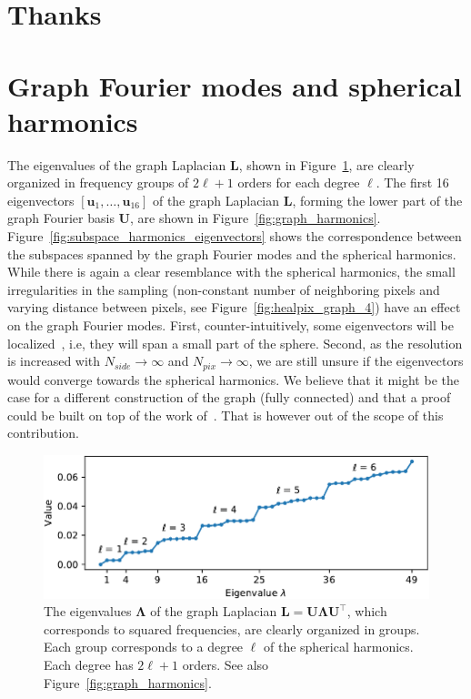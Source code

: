 \documentclass[final,twocolumn,3p,times,authoryear]{elsarticle}
\newcommand{\figref}[1]{Figure~\ref{fig:#1}}
\renewcommand{\b}[1]{{\bm{#1}}}   %
\newcommand{\1}{\b{1}}              %
\newcommand{\0}{\b{0}}              %
\renewcommand{\L}{\b{L}}
\newcommand{\U}{\b{U}}
\newcommand{\trans}{^\intercal}
\newcommand{\bLambda}{\b{\Lambda}}
\begin{document}
\section*{Thanks}

\appendix

\section{Graph Fourier modes and spherical harmonics}
\label{sec:comparison_spherical_harmonics}
\label{sec:border_effects}

The eigenvalues of the graph Laplacian $\L$, shown in \figref{graph_eigenvalues}, are clearly organized in frequency groups of $2\ell + 1$ orders for each degree $\ell$.
The first 16 eigenvectors $[\b u_1, \ldots, \b u_{16}]$ of the graph Laplacian $\L$, forming the lower part of the graph Fourier basis $\U$, are shown in \figref{graph_harmonics}. \figref{subspace_harmonics_eigenvectors} shows the correspondence between the subspaces spanned by the graph Fourier modes and the spherical harmonics. While there is again a clear resemblance with the spherical harmonics, the small irregularities in the sampling (non-constant number of neighboring pixels and varying distance between pixels, see \figref{healpix_graph_4}) have an effect on the graph Fourier modes.
First, counter-intuitively, some eigenvectors will be localized~\citep{perraudin2018global}, i.e, they will span a small part of the sphere.
Second, as the resolution is increased with $N_{side} \rightarrow \infty$ and $N_{pix} \rightarrow \infty$, we are still unsure if the eigenvectors would converge towards the spherical harmonics. We believe that it might be the case for a different construction of the graph (fully connected) and that a proof could be built on top of the work of~\cite{belkin2007convergence}. That is however out of the scope of this contribution.

\begin{figure}
	\centering
	\includegraphics[width=\linewidth]{graph_eigenvalues}
	\caption{The eigenvalues $\bLambda$ of the graph Laplacian $\L = \U \bLambda \U\trans$, which corresponds to squared frequencies, are clearly organized in groups. Each group corresponds to a degree $\ell$ of the spherical harmonics. Each degree has $2\ell + 1$ orders. See also \figref{graph_harmonics}.}
	\label{fig:graph_eigenvalues}
\end{figure}
\end{document}
